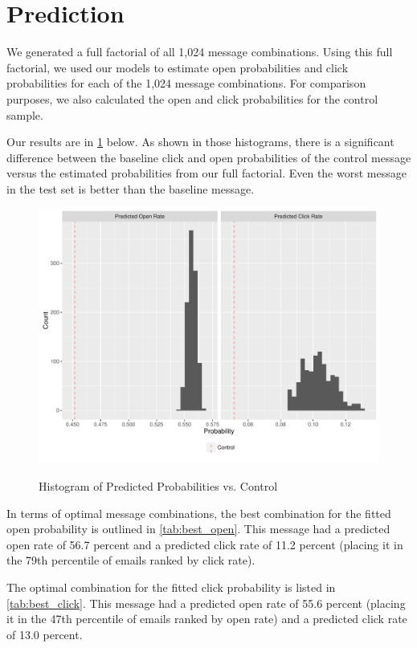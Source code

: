 \section{Prediction} %

We generated a full factorial of all 1,024 message combinations. Using this full factorial, we used our models to estimate open probabilities and click probabilities for each of the 1,024 message combinations. For comparison purposes, we also calculated the open and click probabilities for the control sample.

Our results are in \cref{fig:q3_hist} below. As shown in those histograms, there is a significant difference between the baseline click and open probabilities of the control message versus the estimated probabilities from our full factorial. Even the worst message in the test set is better than the baseline message.

\begin{figure}[!htb]
  \centering
  \caption{Histogram of Predicted Probabilities vs. Control}
  \includegraphics[scale=0.5]{q3_hist.pdf}
  \label{fig:q3_hist}
\end{figure}

In terms of optimal message combinations, the best combination for the fitted open probability is outlined in \cref{tab:best_open}. This message had a predicted open rate of 56.7 percent and a predicted click rate of 11.2 percent (placing it in the 79th percentile of emails ranked by click rate).

The optimal combination for the fitted click probability  is listed in \cref{tab:best_click}. This message had a predicted open rate of 55.6 percent (placing it in the 47th percentile of emails ranked by open rate) and a predicted click rate of 13.0 percent.

